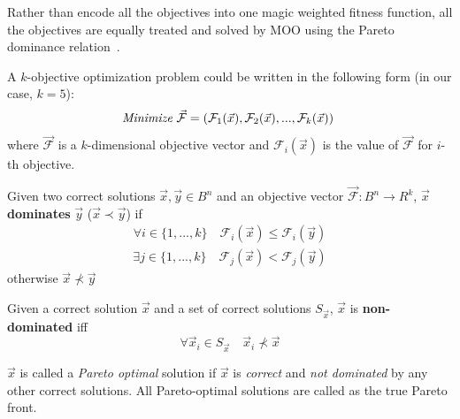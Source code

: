 Rather than encode all the objectives into one magic weighted fitness function, all the objectives are equally treated and solved by MOO using the Pareto dominance relation~\cite{mopsurvey2008}.


A $k$-objective optimization problem could be written in the following form %
(in our case, $k = 5$):
\begin{equation}\label{eq:min}
\begin{split}
\emph{Minimize}\ \mathcal{\vec F}=(\mathcal{F}_1(\vec x), \mathcal{F}_2(\vec x),..., \mathcal{F}_k(\vec x))\ \\ %
\end{split}
\end{equation}
\noindent where $\mathcal{\vec F}$ is a $k$-dimensional objective vector and  $\mathcal{F}_i(\vec x)$ is the value of $\mathcal{\vec F}$ for $i$-th objective.
\begin{myDef}
Given two correct solutions $\vec x, \vec y \in B^n$ and an objective vector $ \mathcal{\vec F}: B^n \rightarrow R^k$, $\vec x$ \textbf{dominates} $\vec y$ ($ \vec x \prec \vec y$) if
    \begin{equation}
    \begin{split}
  \forall i \in \{1,...,k\} \quad \mathcal{F}_i(\vec x) \le \mathcal{F}_i(\vec y)
  \end{split}
     \end{equation}
    \begin{equation}
     \begin{split}
   \exists j \in \{1,...,k\} \quad \mathcal{F}_j(\vec x) < \mathcal{F}_j(\vec y)
     \end{split}
   \end{equation}
otherwise $\vec x \not\prec \vec y$
\end{myDef}
\vspace{-2mm}

\vspace{-2mm}
\begin{myDef}
Given a correct solution $\vec x$ and a set of correct solutions $S_{\vec x}$, $\vec x$ is \textbf{non-dominated} iff
      \begin{equation}
  \forall \vec x_i \in S_{\vec x} \quad \vec x_i \not\prec \vec x
       \end{equation}
\end{myDef}
\vspace{-2mm}
$\vec x$ is called a \emph{Pareto optimal} solution if $\vec x$ is \emph{correct} and \emph{not dominated} by any other correct solutions. All Pareto-optimal solutions are called as the true Pareto front.

